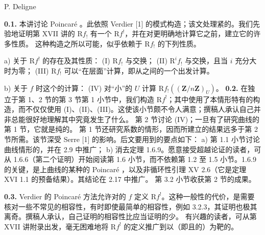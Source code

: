 \begin{center}P. Deligne\end{center}
\textbf{0.1.} 本讲讨论 Poincaré 。此依照 Verdier [1] 的模式构造；该文处理紧的。我们先验地证明第 XVII 讲的 $\mathrm Rf_!$ 有一个 $\mathrm Rf^!$，并在对更明确地计算它之前，建立它的许多性质。
这种构造之所以可能，似乎依赖于 $\mathrm Rf_!$ 的下列性质。

\noindent a) 关于 $\mathrm Rf^!$ 的存在及其性质：
(I)  $\mathrm Rf_!$ 与交换；
(II)  $\mathrm R^if_!$ 与交换，且当 $i$ 充分大时为零；
(III)  $\mathrm Rf_!$ 可以“在层面”计算，即从之间的一个出发计算。

\noindent b) 关于 $f$ 时这个的计算：
(IV) 对“小”的 $U$ 计算 $\mathrm Rf_!((\mathbf Z/n\mathbf Z)_U)$。
\textbf{0.2.} 在独立于第 1、2 节的第 3 节第 1 小节中，我们构造 $\mathrm Rf^!$；其中使用了本情形特有的构造，而不仅仅使用 (I)、(II)、(III)。这使该小节颇不令人满意；撰稿人承认自己并非总能很好地理解其中究竟发生了什么。
第 2 节讨论 (IV)；一旦有了研究曲线的第 1 节，它就是纯的。
第 1 节还研究系数的情形，因而所建立的结果远多于第 2 节所需。该节深受 Serre [1] 的影响。后文要用到的要点如下：
a) 第 1.1 小节讨论曲线情形的，并在 2.9 中推广；
b) 消去定理 1.6.9。愿意接受超越论证的读者，可从 1.6.6（第二个证明）开始阅读第 1.6 小节，而不依赖第 1.2 至 1.5 小节。1.6.9 的关键，是上曲线的某种的 Poincaré ，以及非循环性引理 XV 2.6（它是定理 XVI 1.1 的预备结果）。其结论在 2.17 中推广。
第 3.2 小节收获第 2 节的成果。

\textbf{0.3.} Verdier 的 Poincaré 方法允许对的 $f$ 定义 $\mathrm Rf^!$。这种一般性的代价，是需要核对一些不常见的相容性，有时即使最简单的相容性，例如 3.2.3，其证明也极其离奇。撰稿人承认，自己证明的相容性比应当证明的少。
有兴趣的读者，可从第 XVII 讲附录出发，毫无困难地将 $\mathrm Rf^!$ 的定义推广到以（即且的）为靶的。

